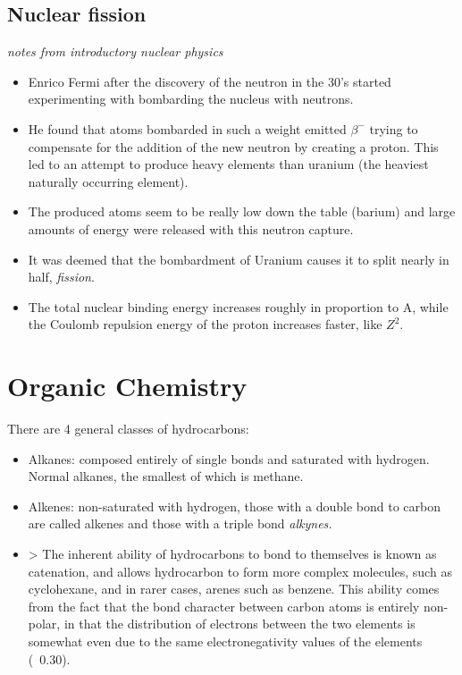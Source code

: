 \documentclass[12pt]{article}
\begin{document}
\subsection{Nuclear fission}\label{nuclear-fission}

\emph{notes from introductory nuclear physics}

\begin{itemize}
\item
  Enrico Fermi after the discovery of the neutron in the 30's started
  experimenting with bombarding the nucleus with neutrons.
\item
  He found that atoms bombarded in such a weight emitted \(\beta^-\)
  trying to compensate for the addition of the new neutron by creating a
  proton. This led to an attempt to produce heavy elements than uranium
  (the heaviest naturally occurring element).
\item
  The produced atoms seem to be really low down the table (barium) and
  large amounts of energy were released with this neutron capture.
\item
  It was deemed that the bombardment of Uranium causes it to split
  nearly in half, \emph{fission}.
\item
  The total nuclear binding energy increases roughly in proportion to A,
  while the Coulomb repulsion energy of the proton increases faster,
  like \(Z^2\).
\end{itemize}

\section{Organic Chemistry}\label{organic-chemistry}

There are 4 general classes of hydrocarbons:
\begin{itemize}
    \item Alkanes: composed entirely of single bonds and saturated with
        hydrogen. Normal alkanes, the smallest of which is methane. 
    \item  Alkenes: non-saturated with hydrogen, those with a double bond to
        carbon are called alkenes and those with a triple bond \it{alkynes}.
    \item > The inherent ability of hydrocarbons to bond to themselves is known
        as catenation, and allows hydrocarbon to form more complex molecules,
        such as cyclohexane, and in rarer cases, arenes such as benzene. This
        ability comes from the fact that the bond character between carbon atoms
        is entirely non-polar, in that the distribution of electrons between the
        two elements is somewhat even due to the same electronegativity values
        of the elements (~0.30).
\end{itemize}
\end{document}
